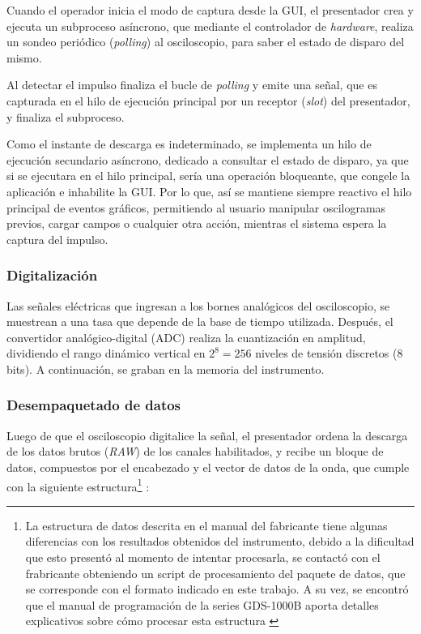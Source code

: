 Cuando el operador inicia el modo de captura desde la GUI, el presentador crea y ejecuta un subproceso asíncrono, que mediante el controlador de \emph{hardware}, realiza un sondeo periódico (\emph{polling}) al osciloscopio, para saber el estado de disparo del mismo.

Al detectar el impulso finaliza el bucle de \emph{polling} y emite una señal, que es capturada en el hilo de ejecución principal por un receptor (\emph{slot}) del presentador, y finaliza el subproceso.

Como el instante de descarga es indeterminado, se implementa un hilo de ejecución secundario asíncrono, dedicado a consultar el estado de disparo, ya que si se ejecutara en el hilo principal, sería una operación bloqueante, que congele la aplicación e inhabilite la GUI. Por lo que, así se mantiene siempre reactivo el hilo principal de eventos gráficos, permitiendo al usuario manipular oscilogramas previos, cargar campos o cualquier otra acción, mientras el sistema espera la captura del impulso.

\subsubsection{Digitalización}

Las señales eléctricas que ingresan a los bornes analógicos del osciloscopio, se muestrean a una tasa que depende de la base de tiempo utilizada. Después, el convertidor analógico-digital (ADC) realiza la cuantización en amplitud, dividiendo el rango dinámico vertical en $2^8 = 256$ niveles de tensión discretos (\num{8} bits). A continuación, se graban en la memoria del instrumento.

\subsubsection{Desempaquetado de datos}
\label{subsec:desempaquetado_datos}

Luego de que el osciloscopio digitalice la señal, el presentador ordena la descarga de los datos brutos (\emph{RAW}) de los canales habilitados, y recibe un bloque de datos, compuestos por el encabezado y el vector de datos de la onda, que cumple con la siguiente estructura\footnote{La estructura de datos descrita en el manual del fabricante tiene algunas diferencias con los resultados obtenidos del instrumento, debido a la dificultad que esto presentó al momento de intentar procesarla, se contactó con el frabricante obteniendo un script de procesamiento del paquete de datos, que se corresponde con el formato indicado en este trabajo. A su vez, se encontró que el manual de programación de la series GDS-1000B aporta detalles explicativos sobre cómo procesar esta estructura \cite{gds1000b_ProgrammingManual}} \cite{gds1000au_ProgrammingManual}:

